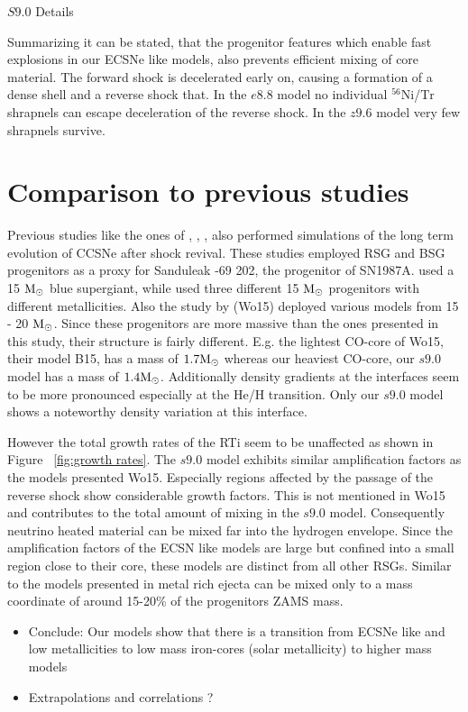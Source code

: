 \documentclass[fleqn,usenatbib]{mnras}
\newcommand{\nickel}{\ensuremath{\mathrm{^{56}Ni}}\xspace}
\newcommand{\tracer}{\ensuremath{\mathrm{Tr}}\xspace}
\newcommand{\solm}{\ensuremath{\rm{M_{\odot}}}\xspace}
\newcommand{\COM}[1]{{\color{orange}#1}}
\begin{document}
\COM{$S9.0$ Details}

Summarizing it can be stated, that the progenitor features which enable fast explosions in our ECSNe like models, also prevents efficient mixing of core material. The forward shock is decelerated early on, causing a formation of a dense shell and a reverse shock that. In the $e8.8$ model no individual \nickel/\tracer shrapnels can escape deceleration of the reverse shock. In the $z9.6$ model very few shrapnels survive. 
\section{Comparison to previous studies}
\label{sec:Comparison to previous studies}

Previous studies like the ones of \cite{Hammer2010}, \cite{Joggerst2010}, \citet{Wongwathanarat2015}, \citet{Kifonidis2006} also performed simulations of the long term evolution of CCSNe after shock revival. These studies employed RSG and BSG progenitors as a proxy for Sanduleak -69 202, the progenitor of SN1987A. \citet{Hammer2010} used a 15 \solm blue supergiant, while \citet{Joggerst2010} used three different 15 \solm progenitors with different metallicities. Also the study by
\citet{Wongwathanarat2015} (Wo15) deployed various models from 15 - 20 \solm. 
Since these progenitors are more massive than the ones presented in this study, their structure is fairly different. E.g. the lightest CO-core of Wo15, their model B15, has a mass of $1.7\solm$ whereas our heaviest CO-core, our $s9.0$ model has a mass of $1.4\solm$. Additionally density gradients at the interfaces seem to be more pronounced especially at the He/H transition. Only our $s9.0$ model shows a noteworthy density variation at this interface.

However the total growth rates of the RTi seem to be unaffected as shown in Figure ~\ref{fig:growth rates}. The $s9.0$ model exhibits similar amplification factors as the models presented Wo15. Especially regions affected by the passage of the reverse shock show considerable growth factors. This is not mentioned in Wo15 and contributes to the total amount of mixing in the $s9.0$ model. Consequently neutrino heated material can be mixed far into the hydrogen envelope. 
Since the amplification factors of the ECSN like models are large but confined into a small region close to their core, these models are distinct from all other RSGs. Similar to the models presented in \citet{Joggerst2010} metal rich ejecta can be mixed only to a mass coordinate of around 15-20\% of the progenitors ZAMS mass.
\COM{
\begin{itemize}
    \item Conclude: Our models show that there is a transition from ECSNe like and low metallicities to low mass iron-cores (solar metallicity) to higher mass models
    \item Extrapolations and correlations ?
\end{itemize}
}
\end{document}
